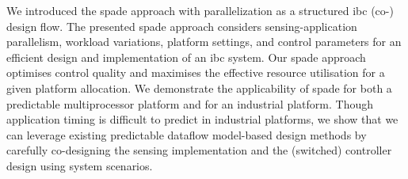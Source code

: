 We introduced the \gls{spade} approach with parallelization as a structured \gls{ibc} (co-) design flow. 
The presented \gls{spade} approach considers sensing-application parallelism, workload variations, platform settings, and control parameters for an efficient design and implementation of an \gls{ibc} system.
Our \gls{spade} approach optimises control quality and maximises the effective resource utilisation for a given platform allocation.
We demonstrate the applicability of \gls{spade} for both a predictable multiprocessor platform and for an industrial platform.
Though application timing is difficult to predict in  industrial platforms, we show that we can leverage existing predictable dataflow model-based design methods by carefully co-designing the sensing implementation and the (switched) controller design using system scenarios. 